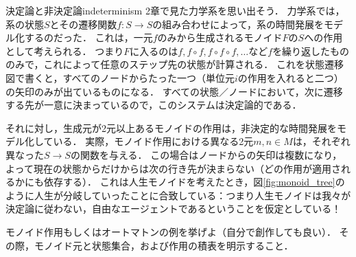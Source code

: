 \documentclass[11pt,a4paper, dvipdfmx]{jsarticle}
\begin{document}
\begin{rei}{決定論と非決定論}{indeterminism}
    2章で見た力学系を思い出そう．
    力学系では，系の状態$S$とその遷移関数$f:S \to S$の組み合わせによって，系の時間発展をモデル化するのだった．
    これは，一元$f$のみから生成されるモノイド$F$の$S$への作用として考えられる．
    つまり$F$に入るのは$f, f \circ f, f \circ f \circ f, \dots$など$f$を繰り返したもののみで，これによって任意のステップ先の状態が計算される．
    これを状態遷移図で書くと，すべてのノードからたった一つ（単位元$i$の作用を入れると二つ）の矢印のみが出ているものになる．
    すべての状態／ノードにおいて，次に遷移する先が一意に決まっているので，このシステムは決定論的である．
    
    それに対し，生成元が2元以上あるモノイドの作用は，非決定的な時間発展をモデル化している．
    実際，モノイド作用における異なる2元$m, n \in M$は，それぞれ異なった$S \to S$の関数を与える．
    この場合はノードからの矢印は複数になり，よって現在の状態からだけからは次の行き先が決まらない（どの作用が適用されるかにも依存する）．
    これは人生モノイドを考えたとき，図\ref{fig:monoid_tree}のように人生が分岐していったことに合致している：つまり人生モノイドは我々が決定論に従わない，自由なエージェントであるということを仮定としている！
\end{rei}


\begin{renshu}{}{}
    モノイド作用もしくはオートマトンの例を挙げよ（自分で創作しても良い）．
    その際，モノイド元と状態集合，および作用の積表を明示すること．
\end{renshu}
    






\end{document}
